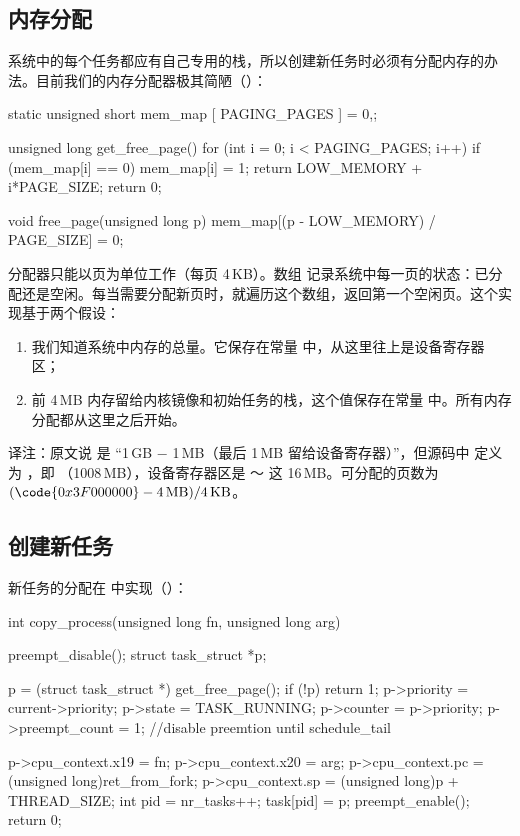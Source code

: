 \subsection{内存分配}

系统中的每个任务都应有自己专用的栈，所以创建新任务时必须有分配内存的办法。目前我们的内存分配器极其简陋（）：

\begin{ccode}
static unsigned short mem_map [ PAGING_PAGES ] = {0,};

unsigned long get_free_page()
{
	for (int i = 0; i < PAGING_PAGES; i++){
		if (mem_map[i] == 0){
			mem_map[i] = 1;
			return LOW_MEMORY + i*PAGE_SIZE;
		}
	}
	return 0;
}

void free_page(unsigned long p){
	mem_map[(p - LOW_MEMORY) / PAGE_SIZE] = 0;
}
\end{ccode}

分配器只能以页为单位工作（每页 4\,KB）。数组  记录系统中每一页的状态：已分配还是空闲。每当需要分配新页时，就遍历这个数组，返回第一个空闲页。这个实现基于两个假设：

\begin{enumerate}
  \item 我们知道系统中内存的总量。它保存在常量  中，从这里往上是设备寄存器区；
  \item 前 4\,MB 内存留给内核镜像和初始任务的栈，这个值保存在常量  中。所有内存分配都从这里之后开始。
\end{enumerate}

\begin{remark}
  译注：原文说  是 “1\,GB $-$ 1\,MB（最后 1\,MB 留给设备寄存器）”，但源码中  定义为 ，即 （1008\,MB），设备寄存器区是 ～ 这 16\,MB。可分配的页数为 $(\code{0x3F000000} - 4\,\text{MB}) / 4\,\text{KB}$。
\end{remark}

\subsection{创建新任务}

新任务的分配在  中实现（）：

\begin{ccode}
int copy_process(unsigned long fn, unsigned long arg)
{
	preempt_disable();
	struct task_struct *p;

	p = (struct task_struct *) get_free_page();
	if (!p)
		return 1;
	p->priority = current->priority;
	p->state = TASK_RUNNING;
	p->counter = p->priority;
	p->preempt_count = 1; //disable preemtion until schedule_tail

	p->cpu_context.x19 = fn;
	p->cpu_context.x20 = arg;
	p->cpu_context.pc = (unsigned long)ret_from_fork;
	p->cpu_context.sp = (unsigned long)p + THREAD_SIZE;
	int pid = nr_tasks++;
	task[pid] = p;
	preempt_enable();
	return 0;
}
\end{ccode}

